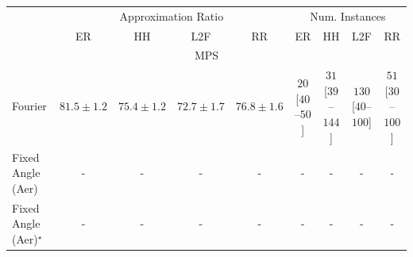 \begin{tabular}{l|cccc|cccc|}
\toprule
& \multicolumn{4}{c|}{Approximation Ratio} & \multicolumn{4}{c|}{Num. Instances} \\
            & ER & HH & L2F & RR & ER & HH & L2F & RR \\
\midrule
\multicolumn{9}{c}{\rule{0pt}{8pt}MPS} \\
\midrule
Fourier & {\cellcolor[HTML]{782A05}} \color[HTML]{F1F1F1} $81.5\pm 1.2$ & {\cellcolor[HTML]{FEBB47}} \color[HTML]{000000} $75.4\pm 1.2$ & {\cellcolor[HTML]{FFF3B2}} \color[HTML]{000000} $72.7\pm 1.7$ & {\cellcolor[HTML]{FA9125}} \color[HTML]{F1F1F1} $76.8\pm 1.6$ & {\cellcolor[HTML]{FFF3EF}} \color[HTML]{000000} $20$ [$40$--$50$] & {\cellcolor[HTML]{FEF1ED}} \color[HTML]{000000} $31$ [$39$--$144$] & {\cellcolor[HTML]{FDD8D5}} \color[HTML]{000000} $130$ [$40$--$100$] & {\cellcolor[HTML]{FEECE9}} \color[HTML]{000000} $51$ [$30$--$100$] \\
Fixed Angle (Aer) & {\cellcolor[HTML]{000000}} \color[HTML]{F1F1F1} {\cellcolor{white}} \color{black} - & {\cellcolor[HTML]{000000}} \color[HTML]{F1F1F1} {\cellcolor{white}} \color{black} - & {\cellcolor[HTML]{000000}} \color[HTML]{F1F1F1} {\cellcolor{white}} \color{black} - & {\cellcolor[HTML]{000000}} \color[HTML]{F1F1F1} {\cellcolor{white}} \color{black} - & {\cellcolor[HTML]{000000}} \color[HTML]{F1F1F1} {\cellcolor{white}} \color{black} - & {\cellcolor[HTML]{000000}} \color[HTML]{F1F1F1} {\cellcolor{white}} \color{black} - & {\cellcolor[HTML]{000000}} \color[HTML]{F1F1F1} {\cellcolor{white}} \color{black} - & {\cellcolor[HTML]{000000}} \color[HTML]{F1F1F1} {\cellcolor{white}} \color{black} - \\
Fixed Angle (Aer)$^\star$ & {\cellcolor[HTML]{000000}} \color[HTML]{F1F1F1} {\cellcolor{white}} \color{black} - & {\cellcolor[HTML]{000000}} \color[HTML]{F1F1F1} {\cellcolor{white}} \color{black} - & {\cellcolor[HTML]{000000}} \color[HTML]{F1F1F1} {\cellcolor{white}} \color{black} - & {\cellcolor[HTML]{000000}} \color[HTML]{F1F1F1} {\cellcolor{white}} \color{black} - & {\cellcolor[HTML]{000000}} \color[HTML]{F1F1F1} {\cellcolor{white}} \color{black} - & {\cellcolor[HTML]{000000}} \color[HTML]{F1F1F1} {\cellcolor{white}} \color{black} - & {\cellcolor[HTML]{000000}} \color[HTML]{F1F1F1} {\cellcolor{white}} \color{black} - & {\cellcolor[HTML]{000000}} \color[HTML]{F1F1F1} {\cellcolor{white}} \color{black} - \\

\end{tabular}
